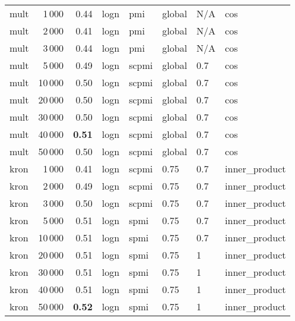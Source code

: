 \begin{tabular}{lrrlllll}
    mult &            1\,000 &  0.44 &  logn &    pmi &  global &  N/A &            cos \\
    mult &            2\,000 &  0.41 &  logn &    pmi &  global &  N/A &            cos \\
    mult &            3\,000 &  0.44 &  logn &    pmi &  global &  N/A &            cos \\
    mult &            5\,000 &  0.49 &  logn &  scpmi &  global &  0.7 &            cos \\
    mult &           10\,000 &  0.50 &  logn &  scpmi &  global &  0.7 &            cos \\
    mult &           20\,000 &  0.50 &  logn &  scpmi &  global &  0.7 &            cos \\
    mult &           30\,000 &  0.50 &  logn &  scpmi &  global &  0.7 &            cos \\
    mult &           40\,000 &  \textbf{0.51} &  logn &  scpmi &  global &  0.7 &            cos \\
    mult &           50\,000 &  0.50 &  logn &  scpmi &  global &  0.7 &            cos \\ \addlinespace
    kron &            1\,000 &  0.41 &  logn &  scpmi &    0.75 &  0.7 &  inner\_product \\
    kron &            2\,000 &  0.49 &  logn &  scpmi &    0.75 &  0.7 &  inner\_product \\
    kron &            3\,000 &  0.50 &  logn &  scpmi &    0.75 &  0.7 &  inner\_product \\
    kron &            5\,000 &  0.51 &  logn &   spmi &    0.75 &  0.7 &  inner\_product \\
    kron &           10\,000 &  0.51 &  logn &   spmi &    0.75 &  0.7 &  inner\_product \\
    kron &           20\,000 &  0.51 &  logn &   spmi &    0.75 &    1 &  inner\_product \\
    kron &           30\,000 &  0.51 &  logn &   spmi &    0.75 &    1 &  inner\_product \\
    kron &           40\,000 &  0.51 &  logn &   spmi &    0.75 &    1 &  inner\_product \\
    kron &           50\,000 &  \textbf{0.52} &  logn &   spmi &    0.75 &    1 &  inner\_product \\
\bottomrule
\end{tabular}

